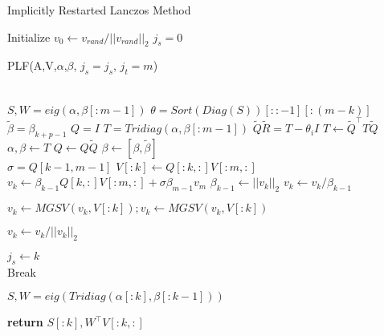 \documentclass[a4paper]{article}
\begin{document}
\begin{algorithm}
\caption{Implicitly Restarted Lanczos Method}\label{alg:IRLM}
\begin{algorithmic}[1]



\State Initialize $v_0 \gets v_{rand}/||v_{rand}||_2 $
\State $j_s = 0$
        \\

        \State PLF(A,V,$\alpha$,$\beta$, $j_s = j_s$, $j_t = m$) 



        \\
        \State $ S,W = eig(\alpha, \beta[:m-1])$
        \State $ \theta = Sort(Diag(S))[::-1][:(m-k)]$ 
        \State $\tilde{\beta} = \beta_{k+p-1}$
        \State $Q = I$
            \State $T = Tridiag(\alpha, \beta[:m-1]) $
            \State $\tilde{Q} \tilde{R} = T -  \theta_i I$
            \State $T \gets \tilde{Q}^\top T \tilde{Q}$
            \State $ \alpha, \beta \gets T$ 
            \State $ Q \gets Q\tilde{Q}$
        \EndFor
        \State $\beta \gets [\beta , \tilde{\beta}]$ 
        \\
        \State $\sigma = Q[k-1,m-1]$
        \State $V[:k] \gets Q[:k,:] V[:m,:]$
        \State $v_k \gets \beta_{k-1}  Q[k,:] V[:m,:] + \sigma \beta_{m-1}  v_{m}$
        \State $\beta_{k-1} \gets ||v_k||_2 $
        \State $v_k \gets v_k / \beta_{k-1}$

        \State $v_{k} \gets MGSV(v_{k}, V[:k]); v_{k} \gets MGSV(v_{k}, V[:k])$

        \State $v_{k} \gets v_{k} / ||v_{k}||_2$
       
        \State $j_s \gets k $ 
        \\
            \State Break
        \EndIf
            
\EndFor

\State $S,W = eig(Tridiag(\alpha[:k], \beta[:k-1]))$


\State \textbf{return} $S[:k], W^\top V[:k,:]$

\EndProcedure
\end{algorithmic}
\end{algorithm}
\end{document}
